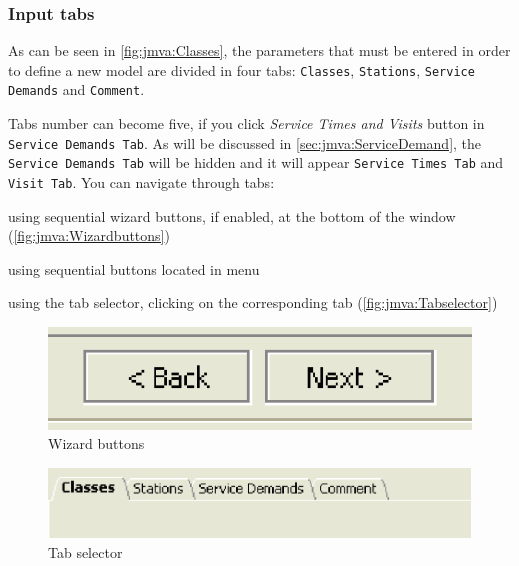 \subsubsection{Input tabs}
As can be seen in \autoref{fig:jmva:Classes}, the parameters that
must be entered in order to define a new model are divided in four
tabs: \texttt{Classes}, \texttt{Stations}, \texttt{Service Demands}
and \texttt{Comment}.

Tabs number can become five, if you click  \emph{Service Times and
Visits} button in \texttt{Service Demands Tab}. As will be discussed
in \autoref{sec:jmva:ServiceDemand}, the \texttt{Service Demands
Tab} will be hidden and it will appear \texttt{Service Times Tab}
and \texttt{Visit Tab}. You can navigate through tabs:
\begin{itemize*}
\item using sequential wizard buttons, if enabled, at the bottom of
the window (\autoref{fig:jmva:Wizardbuttons})
\item using sequential buttons located in menu
\item using the tab selector, clicking on the corresponding
tab (\autoref{fig:jmva:Tabselector})
\end{itemize*}

\begin{figure}[htbp]
    \begin{center}
        \includegraphics[scale=.5]{img/jmva/wizBut}
    \end{center}
    \caption{Wizard buttons}
    \label{fig:jmva:Wizardbuttons}
\end{figure}

\begin{figure}[htbp]
    \begin{center}
        \includegraphics[scale=.5]{img/jmva/tabSel}
    \end{center}
    \caption{Tab selector}
    \label{fig:jmva:Tabselector}
\end{figure}

